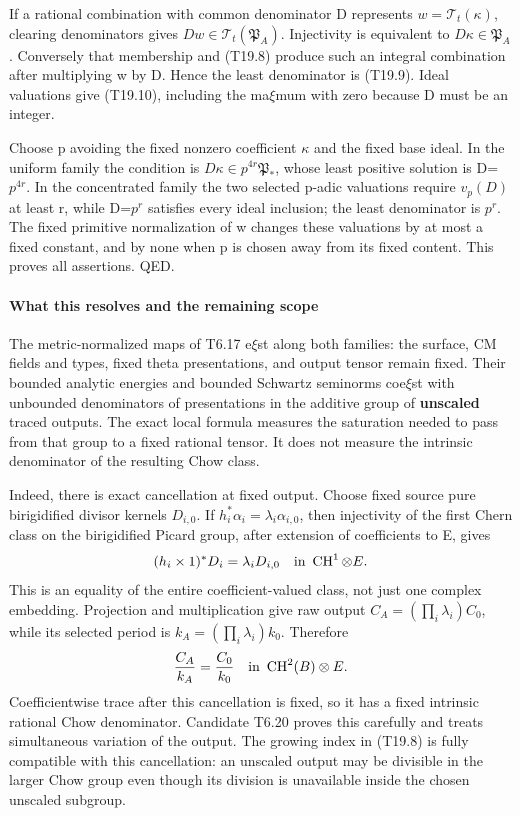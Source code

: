 If a rational combination with common denominator D represents \(w=\mathcal T_t(\kappa)\), clearing denominators gives \(Dw\in\mathcal T_t(\mathfrak P_A)\). Injectivity is equivalent to \(D\kappa\in\mathfrak P_A\). Conversely that membership and (T19.8) produce such an integral combination after multiplying w by D. Hence the least denominator is (T19.9). Ideal valuations give (T19.10), including the ma\(\xi\)mum with zero because D must be an integer.

Choose p avoiding the fixed nonzero coefficient \(\kappa\) and the fixed base ideal. In the uniform family the condition is \(D\kappa\in p^{4r}\mathfrak P_*\), whose least positive solution is D=\(p^{4r}\). In the concentrated family the two selected p-adic valuations require \(v_p(D)\) at least r, while D=\(p^r\) satisfies every ideal inclusion; the least denominator is \(p^r\). The fixed primitive normalization of w changes these valuations by at most a fixed constant, and by none when p is chosen away from its fixed content. This proves all assertions. QED.

\paragraph{What this resolves and the remaining scope}\label{what-this-resolves-and-the-remaining-scope}

The metric-normalized maps of T6.17 e\(\xi\)st along both families: the surface, CM fields and types, fixed theta presentations, and output tensor remain fixed. Their bounded analytic energies and bounded Schwartz seminorms coe\(\xi\)st with unbounded denominators of presentations in the additive group of \textbf{unscaled} traced outputs. The exact local formula measures the saturation needed to pass from that group to a fixed rational tensor. It does not measure the intrinsic denominator of the resulting Chow class.

Indeed, there is exact cancellation at fixed output. Choose fixed source pure birigidified divisor kernels \(D_{i,0}\). If \(h_i^*\alpha_i=\lambda_i\alpha_{i,0}\), then injectivity of the first Chern class on the birigidified Picard group, after extension of coefficients to E, gives \[
 (h_i\times1)^*D_i=\lambda_iD_{i,0}
 \quad\hbox{in }\operatorname{CH}^1\otimes E.
\] This is an equality of the entire coefficient-valued class, not just one complex embedding. Projection and multiplication give raw output \(C_A=(\prod_i\lambda_i)C_0\), while its selected period is \(k_A=(\prod_i\lambda_i)k_0\). Therefore \[
 \frac{C_A}{k_A}=\frac{C_0}{k_0}
 \quad\hbox{in }\operatorname{CH}^2(B)\otimes E.
\] Coefficientwise trace after this cancellation is fixed, so it has a fixed intrinsic rational Chow denominator. Candidate T6.20 proves this carefully and treats simultaneous variation of the output. The growing index in (T19.8) is fully compatible with this cancellation: an unscaled output may be divisible in the larger Chow group even though its division is unavailable inside the chosen unscaled subgroup.


